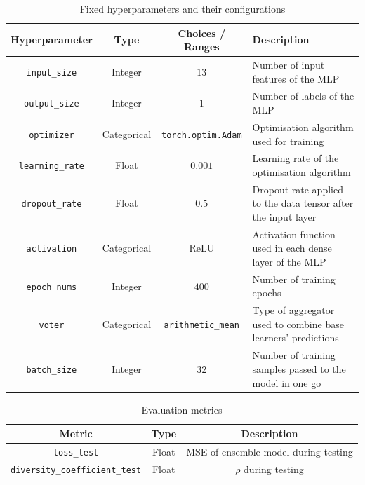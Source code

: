 \begin{table}[H]
    \centering
    \begin{tabular}{|c|c|c|p{5cm}|}
        \hline
        Hyperparameter & Type & Choices / Ranges & Description \\
        \hline
        \small\texttt{input\_size} & Integer & $13$ & Number of input features of the MLP \\
        \hline
        \small\texttt{output\_size} & Integer & $1$ & Number of labels of the MLP \\
        \hline
        \small\texttt{optimizer} & Categorical & \texttt{torch.optim.Adam} & Optimisation algorithm used for training \\
        \hline
        \small\texttt{learning\_rate} & Float & $0.001$ & Learning rate of the optimisation algorithm \\
        \hline
        \small\texttt{dropout\_rate} & Float & $0.5$ & Dropout rate applied to the data tensor after the input layer \\
        \hline
        \small\texttt{activation} & Categorical & ReLU & Activation function used in each dense layer of the MLP \\
        \hline
        \small\texttt{epoch\_nums} & Integer & $400$ & Number of training epochs \\
        \hline
        \small\texttt{voter} & Categorical & \texttt{arithmetic\_mean} & Type of aggregator used to combine base learners' predictions \\
        \hline
        \small\texttt{batch\_size} & Integer & $32$ & Number of training samples passed to the model in one go \\
        \hline
    \end{tabular}
    \caption{Fixed hyperparameters and their configurations}
    \label{table:experiment_3_fixed_hyperparameters}
\end{table}

\begin{table}[H]
    \centering
    \begin{tabular}{|c|c|c|}
        \hline
        Metric & Type & Description \\
        \hline
        \small\texttt{loss\_test} & Float & MSE of ensemble model during testing \\
        \hline
        \small\texttt{diversity\_coefficient\_test} & Float & $\rho$ during testing \\
        \hline
    \end{tabular}
    \caption{Evaluation metrics}
    \label{table:experiment_3_metric}
\end{table}


